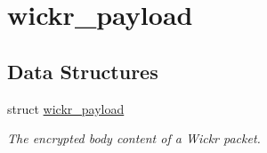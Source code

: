\hypertarget{group__wickr__payload}{}\section{wickr\+\_\+payload}
\label{group__wickr__payload}
\subsection*{Data Structures}
\begin{DoxyCompactItemize}
\item 
struct \mbox{\hyperlink{structwickr__payload}{wickr\+\_\+payload}}
\begin{DoxyCompactList}\small\item\em The encrypted body content of a Wickr packet. \end{DoxyCompactList}\end{DoxyCompactItemize}
